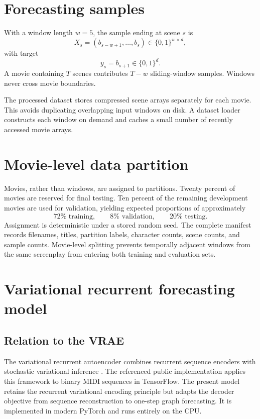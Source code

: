 \documentclass[11pt]{article}
\begin{document}
\section{Forecasting samples}

With a window length $w=5$, the sample ending at scene $s$ is
\begin{equation}
  X_s=(b_{s-w+1},\ldots,b_s)
  \in\{0,1\}^{w\times d},
\end{equation}
with target
\begin{equation}
  y_s=b_{s+1}\in\{0,1\}^{d}.
\end{equation}
A movie containing $T$ scenes contributes $T-w$ sliding-window samples. Windows never cross movie boundaries.

The processed dataset stores compressed scene arrays separately for each movie. This avoids duplicating overlapping input windows on disk. A dataset loader constructs each window on demand and caches a small number of recently accessed movie arrays.

\section{Movie-level data partition}

Movies, rather than windows, are assigned to partitions. Twenty percent of movies are reserved for final testing. Ten percent of the remaining development movies are used for validation, yielding expected proportions of approximately
\[
72\%\text{ training},\qquad 8\%\text{ validation},\qquad 20\%\text{ testing}.
\]
Assignment is deterministic under a stored random seed. The complete manifest records filenames, titles, partition labels, character counts, scene counts, and sample counts. Movie-level splitting prevents temporally adjacent windows from the same screenplay from entering both training and evaluation sets.

\section{Variational recurrent forecasting model}

\subsection{Relation to the VRAE}

The variational recurrent autoencoder combines recurrent sequence encoders with stochastic variational inference \cite{fabius2014vrae,kingma2014vae}. The referenced public implementation applies this framework to binary MIDI sequences in TensorFlow. The present model retains the recurrent variational encoding principle but adapts the decoder objective from sequence reconstruction to one-step graph forecasting. It is implemented in modern PyTorch and runs entirely on the CPU.
\end{document}
